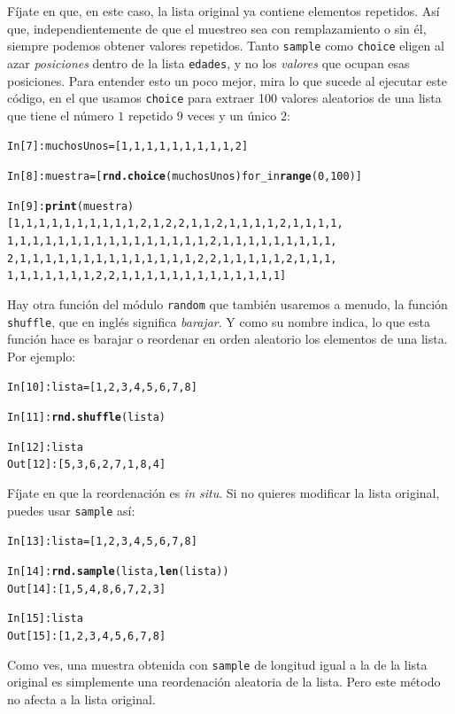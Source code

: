 \documentclass[10pt,a4paper]{article}\usepackage[]{graphicx}\usepackage[]{color}
\makeatletter
\newcommand{\hlkwd}[1]{\textcolor[rgb]{0.737,0.353,0.396}{\textbf{#1}}}%
\newenvironment{kframe}{%
 \def\at@end@of@kframe{}%
 \ifinner\ifhmode%
  \def\at@end@of@kframe{\end{minipage}}%
  \begin{minipage}{\columnwidth}%
 \fi\fi%
 \def\FrameCommand##1{\hskip\@totalleftmargin \hskip-\fboxsep
 \colorbox{shadecolor}{##1}\hskip-\fboxsep
     \hskip-\linewidth \hskip-\@totalleftmargin \hskip\columnwidth}%
 \MakeFramed {\advance\hsize-\width
   \@totalleftmargin\z@ \linewidth\hsize
   \@setminipage}}%
 {\par\unskip\endMakeFramed%
 \at@end@of@kframe}
\newenvironment{knitrout}{}{} %
\newcounter {cont01}
\makeatother
\begin{document}
Fíjate en que, en este caso, la lista original ya contiene elementos repetidos. Así que, independientemente de que el muestreo sea con remplazamiento o sin él, siempre podemos obtener valores repetidos. Tanto {\tt sample} como {\tt choice} eligen al azar {\em posiciones} dentro de la lista {\tt edades}, y no los {\em valores} que ocupan esas posiciones.  Para entender esto un poco mejor, mira lo que sucede al ejecutar este código, en el que usamos {\tt choice} para extraer 100 valores aleatorios de una lista que tiene el número $1$ repetido $9$ veces y un único $2$:
\begin{knitrout}
\color{fgcolor}\begin{kframe}
\begin{alltt}
In [7]: muchosUnos = [1,1,1,1,1,1,1,1,1,2]

In [8]: muestra = [\hlkwd{rnd.choice}(muchosUnos) for _ in \hlkwd{range}(0, 100)]

In [9]: \hlkwd{print}(muestra)
[1, 1, 1, 1, 1, 1, 1, 1, 1, 1, 2, 1, 2, 2, 1, 1, 2, 1, 1, 1, 1, 2, 1, 1, 1, 1,
1, 1, 1, 1, 1, 1, 1, 1, 1, 1, 1, 1, 1, 1, 1, 1, 2, 1, 1, 1, 1, 1, 1, 1, 1, 1,
2, 1, 1, 1, 1, 1, 1, 1, 1, 1, 1, 1, 1, 1, 1, 2, 2, 1, 1, 1, 1, 1, 2, 1, 1, 1,
1, 1, 1, 1, 1, 1, 1, 2, 2, 1, 1, 1, 1, 1, 1, 1, 1, 1, 1, 1, 1, 1]
\end{alltt}
\end{kframe}
\end{knitrout}
Hay otra función del módulo {\tt random} que también usaremos a menudo, la función {\tt shuffle}, que en inglés significa {\em barajar}. Y como su nombre indica, lo que esta función hace es barajar o reordenar en orden aleatorio los elementos de una lista. Por ejemplo:
\begin{knitrout}
\color{fgcolor}\begin{kframe}
\begin{alltt}
In [10]: lista = [1, 2, 3, 4, 5, 6, 7, 8]

In [11]: \hlkwd{rnd.shuffle}(lista)

In [12]: lista
Out[12]: [5, 3, 6, 2, 7, 1, 8, 4]
\end{alltt}
\end{kframe}
\end{knitrout}
Fíjate en que la reordenación es {\em in situ}. Si no quieres modificar la lista original, puedes usar {\tt sample} así:
\begin{knitrout}
\color{fgcolor}\begin{kframe}
\begin{alltt}
In [13]: lista = [1, 2, 3, 4, 5, 6, 7, 8]

In [14]: \hlkwd{rnd.sample}(lista, \hlkwd{len}(lista))
Out[14]: [1, 5, 4, 8, 6, 7, 2, 3]

In [15]: lista
Out[15]: [1, 2, 3, 4, 5, 6, 7, 8]
\end{alltt}
\end{kframe}
\end{knitrout}
Como ves, una muestra obtenida con {\tt sample} de longitud igual a la de la lista original es simplemente una reordenación aleatoria de la lista. Pero este método no afecta a la lista original.
\end{document}
